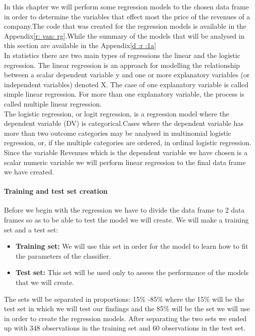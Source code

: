 \documentclass{article}
\begin{document}
In this chapter we will perform some regression models to the chosen data frame in order to determine the variables that effect most the price of the revenues of a company.The code that was created for the regression models is available in the Appendix\ref{r: van: rg}.While the summary of the models that will be analysed in this section are available in the Appendix\ref{d :r :1a}\\
In statistics there are two main types of regressions the linear and the logistic regression. The linear regression is an approach for modelling the relationship between a scalar dependent variable y and one or more explanatory variables (or independent variables) denoted X. The case of one explanatory variable is called simple linear regression. For more than one explanatory variable, the process is called multiple linear regression.\\
The logistic regression, or logit regression, is a regression model where the dependent variable (DV) is categorical.Cases where the dependent variable has more than two outcome categories may be analysed in multinomial logistic regression, or, if the multiple categories are ordered, in ordinal logistic regression.\\
Since the variable Revenues which is the dependent variable we have chosen is a scalar numeric variable we will perform linear regression to the final data frame we have created.
\paragraph{Training and test set creation}
Before we begin with the regression we have to divide the data frame to 2 data frames so as to be able to test the model we will create. We will make a training set and a test set:
\begin{itemize}
\item \textbf{Training set:} We will use this set in order for the model to learn how to fit the parameters of the classifier.
\item \textbf{Test set:} This set will be used only to assess the performance of the models that we will create.
\end{itemize}  
The sets will be separated in proportions: 15\% -85\% where the 15\% will be the test set in which we will test our findings and the 85\% will be the set we will use in order to create the regression models. After separating the two sets we ended up with 348 observations in the training set and 60 observations in the test set.
\end{document}
